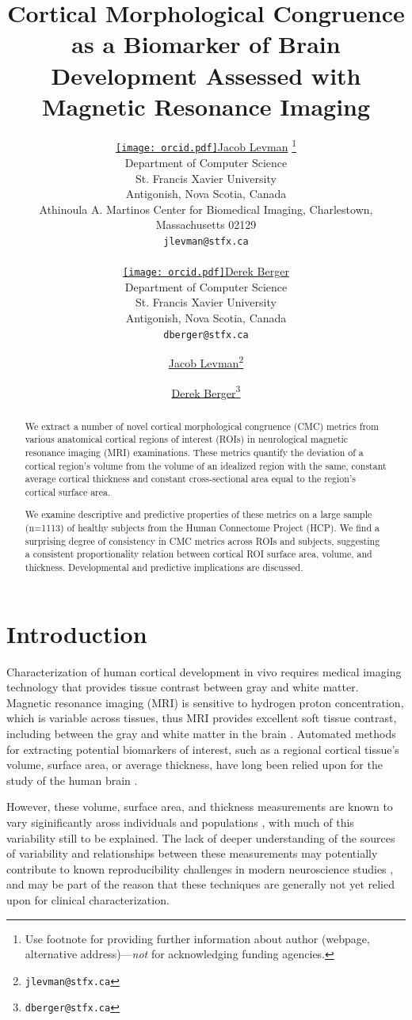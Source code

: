 \documentclass{article}
\title{Cortical Morphological Congruence as a Biomarker of Brain Development Assessed with Magnetic Resonance Imaging}
\author{%
	\href{https://orcid.org/0000-0002-9604-3157}{\texttt{[image: orcid.pdf]}\hspace{1mm}Jacob Levman}
	\thanks{Use footnote for providing further information about author (webpage, alternative address)---\emph{not} for acknowledging funding agencies.} \\
	Department of Computer Science\\
	St. Francis Xavier University\\
	Antigonish, Nova Scotia, Canada\\
	Athinoula A. Martinos Center for Biomedical Imaging, Charlestown, Massachusetts 02129\\
	\texttt{jlevman@stfx.ca} \\

	\And

	\href{https://orcid.org/0000-0003-4733-0624}{\texttt{[image: orcid.pdf]}\hspace{1mm}Derek Berger} \\
	Department of Computer Science\\
	St. Francis Xavier University\\
	Antigonish, Nova Scotia, Canada\\
	\texttt{dberger@stfx.ca} \\
}
\author[1,2]{%
	\href{https://orcid.org/0000-0002-9604-3157}{\usebox{\orcid}\hspace{1mm}Jacob Levman\thanks{\texttt{jlevman@stfx.ca}}}%
}
\author[1]{%
	\href{https://orcid.org/0000-0003-4733-0624}{\usebox{\orcid}\hspace{1mm}Derek Berger\thanks{\texttt{dberger@stfx.ca}}}%
}
\affil[1]{Athinoula A. Martinos Center for Biomedical Imaging, Charlestown, Massachusetts 02129}
\affil[2]{Department of Computer Science, St. Francis Xavier University,Antigonish, Nova Scotia}
\affil[3]{Nova Scotia Health Authority, Halifax, NS, Canada}
\affil[4]{Harvard Medical School, Department of Radiology, Boston, MA, USA.}
\begin{document}
\maketitle



\begin{abstract}
We extract a number of novel cortical morphological congruence (CMC) metrics
from various anatomical cortical regions of interest (ROIs) in neurological
magnetic resonance imaging (MRI) examinations. These metrics quantify the
deviation of a cortical region's volume from the volume of an idealized
region with the same, constant average cortical thickness and constant
cross-sectional area equal to the region's cortical surface area.

We examine descriptive and predictive properties of these metrics on a large
sample (n=1113) of healthy subjects from the Human Connectome Project (HCP).
We find a surprising degree of consistency in CMC metrics across ROIs and
subjects, suggesting a consistent proportionality relation between cortical
ROI surface area, volume, and thickness. Developmental and predictive
implications are discussed.
\end{abstract}




\section{Introduction} \label{intro}

Characterization of human cortical development in vivo requires medical
imaging technology that provides tissue contrast between gray and white
matter. Magnetic resonance imaging (MRI) is sensitive to hydrogen proton
concentration, which is variable across tissues, thus MRI provides excellent
soft tissue contrast, including between the gray and white matter in the
brain \citep{duboisMRINeonatalBrain2021}. Automated methods for extracting
potential biomarkers of interest, such as a regional cortical tissue's
volume, surface area, or average thickness, have long been relied upon for
the study of the human brain
\citep{fischlFreeSurfer2012,levmanPediatricStructuralMRI2017,levmanStructuralMagneticResonance2019a,mccannStructuralMagneticResonance2021}.

However, these volume, surface area, and thickness measurements are known to
vary siginificantly aross individuals and populations
\citep{fischlFreeSurfer2012,levmanPediatricStructuralMRI2017,levmanStructuralMagneticResonance2019a},
with much of this variability still to be explained. The lack of deeper
understanding of the sources of variability and relationships between these
measurements may potentially contribute to known reproducibility challenges
in modern neuroscience studies
\citep{martinezReproducibilityBraincognitionRelationships2015,marekReproducibleBrainwideAssociation2022},
and may be part of the reason that these techniques are generally not yet
relied upon for clinical characterization.
\end{document}
